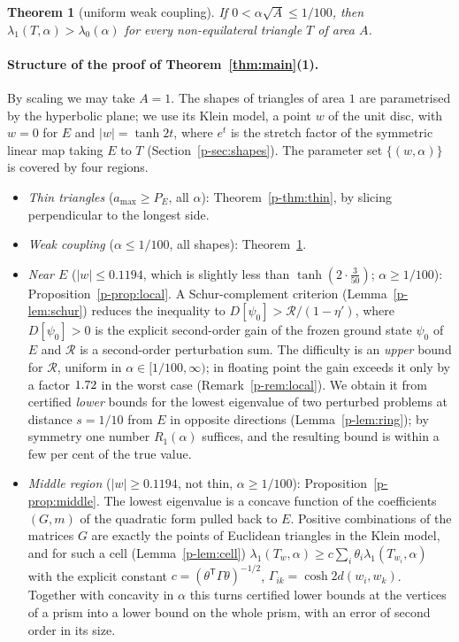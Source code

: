 \documentclass[11pt]{article}
\newtheorem{theorem}{Theorem}[section]
\theoremstyle{remark}
\newcommand{\cR}{\mathcal{R}}
\begin{document}
\begin{theorem}[uniform weak coupling]\label{p-thm:uniform}
If $0<\alpha\sqrt A\le1/100$, then $\lambda_1(T,\alpha)>\lambda_0(\alpha)$ for every
non-equilateral triangle $T$ of area $A$.
\end{theorem}

\paragraph{Structure of the proof of Theorem~\ref{thm:main}(1).} By scaling we may take $A=1$.
The shapes of triangles of area $1$ are parametrised by the hyperbolic plane; we use its Klein
model, a point $w$ of the unit disc, with $w=0$ for $E$ and $|w|=\tanh2t$, where $e^{t}$ is the
stretch factor of the symmetric linear map taking $E$ to $T$ (Section~\ref{p-sec:shapes}).
The parameter set $\{(w,\alpha)\}$ is covered by four regions.
\begin{itemize}
\item[(A)] \emph{Thin triangles} ($a_{\max}\ge P_E$, all $\alpha$): Theorem~\ref{p-thm:thin},
by slicing perpendicular to the longest side.
\item[(S)] \emph{Weak coupling} ($\alpha\le1/100$, all shapes): Theorem~\ref{p-thm:uniform}.
\item[(C)] \emph{Near $E$} ($|w|\le0.1194$, which is slightly less than $\tanh(2\cdot\frac3{50})$;
$\alpha\ge1/100$): Proposition~\ref{p-prop:local}. A
Schur-complement criterion (Lemma~\ref{p-lem:schur}) reduces the inequality to
$D[\psi_0]>\cR/(1-\eta')$, where $D[\psi_0]>0$ is the explicit second-order gain of the frozen
ground state $\psi_0$ of $E$ and $\cR$ is a second-order perturbation sum. The difficulty is an
\emph{upper} bound for $\cR$, uniform in $\alpha\in[1/100,\infty)$; in floating point the gain exceeds
it only by a factor $1.72$ in the worst case (Remark~\ref{p-rem:local}). We obtain it from certified
\emph{lower} bounds for the lowest eigenvalue of two perturbed problems at distance $s=1/10$
from $E$ in opposite directions (Lemma~\ref{p-lem:ring}); by symmetry one number $R_1(\alpha)$
suffices, and the resulting bound is within a few per cent of the true value.
\item[(B)] \emph{Middle region} ($|w|\ge0.1194$, not thin, $\alpha\ge1/100$):
Proposition~\ref{p-prop:middle}. The lowest eigenvalue is a concave function of the coefficients
$(G,m)$ of the quadratic form pulled back to $E$. Positive combinations of the matrices $G$ are
exactly the points of Euclidean triangles in the Klein model, and for such a cell
(Lemma~\ref{p-lem:cell}) $\lambda_1(T_w,\alpha)\ge c\sum_i\theta_i\lambda_1(T_{w_i},\alpha)$ with
the explicit constant $c=(\theta^{\mathsf T}\Gamma\theta)^{-1/2}$,
$\Gamma_{ik}=\cosh2d(w_i,w_k)$. Together with concavity in $\alpha$ this turns certified lower
bounds at the vertices of a prism into a lower bound on the whole prism, with an error of
second order in its size.
\end{itemize}
\end{document}
